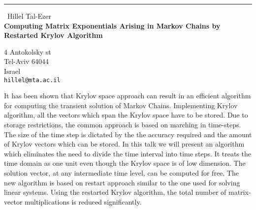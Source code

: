 \documentclass{report}
\begin{document}
\begin{center}
\rule{6in}{1pt} \
{\large Hillel Tal-Ezer \\
{\bf Computing Matrix Exponentials Arising in Markov Chains by Restarted Krylov Algorithm}}

4 Antokolsky st \\ Tel-Aviv 64044 \\ Israel
\\
{\tt hillel@mta.ac.il}\end{center}

It has been shown that Krylov space approach can result in an efficient
algorithm for computing the transient solution of Markov Chains.
Implementing Krylov algorithm, all the vectors which span the Krylov
space have to be stored. Due to storage restrictions, the common approach
is based on marching in time-steps. The size of the time step is dictated
by the the accuracy required and the amount of Krylov vectors which can
be stored. In this talk we will present an algorithm which eliminates the
need to divide the time interval into time steps. It treats the time
domain as one unit even though the Krylov space is of low dimension. The
solution vector, at any intermediate time level, can be computed for
free. The new algorithm is based on restart approach similar to the one
used for solving linear systems. Using the restarted Krylov algorithm,
the total number of matrix-vector multiplications is reduced
significantly.
\end{document}
